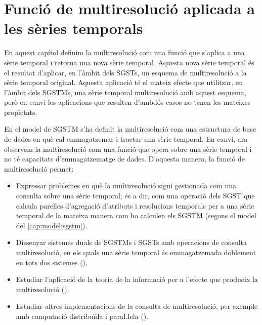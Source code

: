 
\chapter{Funció de multiresolució aplicada a les sèries temporals}


En aquest capítol definim la multiresolució com una funció que
s'aplica a una sèrie temporal i retorna una nova sèrie temporal.
Aquesta nova sèrie temporal és el resultat d'aplicar, en l'àmbit dels
\glspl{SGST}, un esquema de multiresolució a la sèrie temporal
original. Aquesta aplicació té el mateix efecte que utilitzar, en
l'àmbit dels \glspl{SGSTM}, una sèrie temporal multiresolució amb
aquest esquema, però en canvi les aplicacions que resulten d'ambdós
casos no tenen les mateixes propietats.

En el model de \gls{SGSTM} s'ha definit la
multiresolució com una estructura de base de dades en què cal
emmagatzemar i tractar una sèrie temporal. En canvi, ara observem la
multiresolució com una funció que opera sobre una sèrie
temporal i no té capacitats d'emmagatzematge de dades.  D'aquesta
manera, la funció de multiresolució permet:
\begin{itemize}

\item Expressar problemes en què la multiresolució sigui gestionada
  com una consulta sobre una sèrie temporal; és a dir, com una
  operació dels \gls{SGST} que calcula parelles d'agregació d'atributs
  i resolucions temporals per a una sèrie temporal de la mateixa
  manera com ho calculen els \gls{SGSTM} (segons el model del
  \autoref{cap:model:sgstm}).

\item Dissenyar sistemes duals de \glspl{SGSTM} i \glspl{SGST} amb
  operacions de consulta multiresolució, en els quals una sèrie
  temporal és emmagatzemada doblement en tots dos sistemes
  ().

\item Estudiar l'aplicació de la teoria de la informació per a
  l'efecte que produeix la multiresolució
  ().

\item Estudiar altres implementacions de la consulta de
  multiresolució, per exemple amb computació distribuïda i para\l.lela
  ().

\end{itemize}




